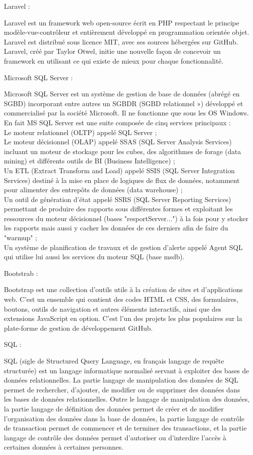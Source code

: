 \begin{description}
{\bf \item Laravel :}
 Laravel est un framework web open-source écrit en PHP respectant le principe modèle-vue-contrôleur et entièrement développé en programmation orientée objet. Laravel est distribué sous licence MIT, avec ses sources hébergées sur GitHub. Laravel, créé par Taylor Otwel, initie une nouvelle façon de concevoir un framework en utilisant ce qui existe de mieux pour chaque fonctionnalité\cite{cite2}.
{\bf \item Microsoft SQL Server :}
Microsoft SQL Server est un système de gestion de base de données (abrégé en SGBD) incorporant entre autres un SGBDR (SGBD relationnel ») développé et commercialisé par la société Microsoft. Il ne fonctionne que sous les OS Windows. En fait MS SQL Server est une suite composée de cinq services principaux :\\
Le moteur relationnel (OLTP) appelé SQL Server ;\\
Le moteur décisionnel (OLAP) appelé SSAS (SQL Server Analysis Services) incluant un moteur de stockage pour les cubes, des algorithmes de forage (data mining) et différents outils de BI (Business Intelligence) ;\\
Un ETL (Extract Transform and Load) appelé SSIS (SQL Server Integration Services) destiné à la mise en place de logiques de flux de données, notamment pour alimenter des entrepôts de données (data warehouse) ;\\
Un outil de génération d'état appelé SSRS (SQL Server Reporting Services) permettant de produire des rapports sous différentes formes et exploitant les ressources du moteur décisionnel (bases "resportServer...") à la fois pour y stocker les rapports mais aussi y cacher les données de ces derniers afin de faire du "warmup" ;\\
Un système de planification de travaux et de gestion d'alerte appelé Agent SQL qui utilise lui aussi les services du moteur SQL (base msdb).
{\bf \item Bootstrab :}
Bootstrap est une collection d'outils utile à la création de sites et d'applications web. C'est un ensemble qui contient des codes HTML et CSS, des formulaires, boutons, outils de navigation et autres éléments interactifs, ainsi que des extensions JavaScript en option. C'est l'un des projets les plus populaires sur la plate-forme de gestion de développement GitHub.
{\bf \item SQL :} SQL (sigle de Structured Query Language, en français langage de requête structurée) est un langage informatique normalisé servant à exploiter des bases de données relationnelles. La partie langage de manipulation des données de SQL permet de rechercher, d'ajouter, de modifier ou de supprimer des données dans les bases de données relationnelles. Outre le langage de manipulation des données, la partie langage de définition des données permet de créer et de modifier l'organisation des données dans la base de données, la partie langage de contrôle de transaction permet de commencer et de terminer des transactions, et la partie langage de contrôle des données permet d'autoriser ou d'interdire l'accès à certaines données à certaines personnes.

\end{description}
